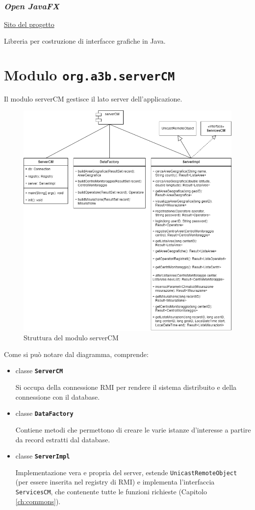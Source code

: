 \subsection{\textsl{Open JavaFX}}

\href{https://openjfx.io/}{Sito del progetto}

Libreria per costruzione di interfacce grafiche in Java.

\chapter{Modulo \texttt{org.a3b.serverCM}}
Il modulo serverCM gestisce il lato server dell'applicazione.
\label{ch:server}

\begin{figure}[h]
	\centering
	\caption{Struttura del modulo serverCM}
	\label{fig:severcm}
	\includegraphics[width=0.9\linewidth]{../../fig/img/tecnico/serverCM.drawio}
\end{figure}
\pagebreak

Come si può notare dal diagramma, comprende:
\begin{itemize}
	\item classe \textbf{\texttt{ServerCM}}
		
		Si occupa della connessione RMI per rendere il sistema distribuito e della connessione con il database.
	\item classe \textbf{\texttt{DataFactory}}
		
		Contiene metodi che permettono di creare le varie istanze d'interesse a partire da record estratti dal database. 
	\item classe \textbf{\texttt{ServerImpl}}
		
		Implementazione vera e propria del server, estende \texttt{UnicastRemoteObject} (per essere inserita nel registry di RMI) e implementa l'interfaccia \texttt{ServicesCM}, che contenente tutte le funzioni richieste (Capitolo \ref{ch:commons}).
\end{itemize}

